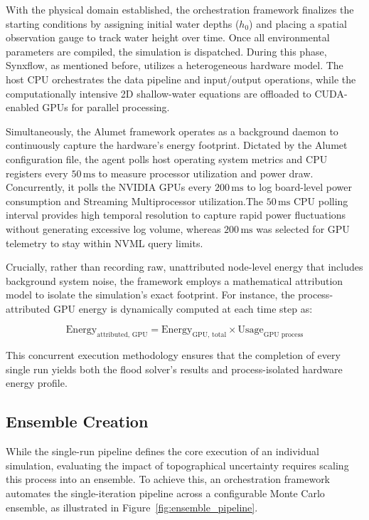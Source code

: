 With the physical domain established, the orchestration framework finalizes the starting conditions by assigning initial water depths ($h_0$) and placing a spatial observation gauge to track water height over time. Once all environmental parameters are compiled, the simulation is dispatched. During this phase, Synxflow, as mentioned before, utilizes a heterogeneous hardware model. The host CPU orchestrates the data pipeline and input/output operations, while the computationally intensive 2D shallow-water equations are offloaded to CUDA-enabled GPUs for parallel processing.

Simultaneously, the Alumet framework operates as a background daemon to continuously capture the hardware's energy footprint. Dictated by the Alumet configuration file, the agent polls host operating system metrics and CPU registers every $50\,\text{ms}$ to measure processor utilization and power draw. Concurrently, it polls the NVIDIA GPUs every $200\,\text{ms}$ to log board-level power consumption and Streaming Multiprocessor utilization.The $50\,\text{ms}$ CPU polling interval provides high temporal resolution to capture rapid power fluctuations without generating excessive log volume, whereas $200\,\text{ms}$ was selected for GPU telemetry to stay within NVML query limits.

Crucially, rather than recording raw, unattributed node-level energy that includes background system noise, the framework employs a mathematical attribution model to isolate the simulation's exact footprint. For instance, the process-attributed GPU energy is dynamically computed at each time step as:

\begin{equation}
\text{Energy}_{\text{attributed, GPU}} = \text{Energy}_{\text{GPU, total}} \times \text{Usage}_{\text{GPU process}}
\label{eq:gpu_energy_attribution}
\end{equation}

This concurrent execution methodology ensures that the completion of every single run yields both the flood solver's results and process-isolated hardware energy profile.


\subsection{Ensemble Creation}
\label{sec:ensemble-orchestration}

While the single-run pipeline defines the core execution of an individual simulation, evaluating the impact of topographical uncertainty requires scaling this process into an ensemble. To achieve this, an orchestration framework automates the single-iteration pipeline across a configurable Monte Carlo ensemble, as illustrated in Figure~\ref{fig:ensemble_pipeline}. 

